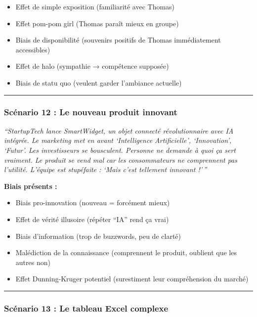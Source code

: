 \documentclass[
]{article}
\providecommand{\tightlist}{%
  \setlength{\itemsep}{0pt}\setlength{\parskip}{0pt}}
\begin{document}
\begin{itemize}
\tightlist
\item
  Effet de simple exposition (familiarité avec Thomas)
\item
  Effet pom-pom girl (Thomas paraît mieux en groupe)
\item
  Biais de disponibilité (souvenirs positifs de Thomas immédiatement
  accessibles)
\item
  Effet de halo (sympathie → compétence supposée)
\item
  Biais de statu quo (veulent garder l'ambiance actuelle)
\end{itemize}

\begin{center}\rule{0.5\linewidth}{0.5pt}\end{center}

\subsubsection{Scénario 12 : Le nouveau produit
innovant}\label{scuxe9nario-12-le-nouveau-produit-innovant}

\emph{``StartupTech lance SmartWidget, un objet connecté révolutionnaire
avec IA intégrée. Le marketing met en avant `Intelligence Artificielle',
`Innovation', `Futur'. Les investisseurs se bousculent. Personne ne
demande à quoi ça sert vraiment. Le produit se vend mal car les
consommateurs ne comprennent pas l'utilité. L'équipe est stupéfaite :
`Mais c'est tellement innovant !'\,''}

\textbf{Biais présents :}

\begin{itemize}
\tightlist
\item
  Biais pro-innovation (nouveau = forcément mieux)
\item
  Effet de vérité illusoire (répéter ``IA'' rend ça vrai)
\item
  Biais d'information (trop de buzzwords, peu de clarté)
\item
  Malédiction de la connaissance (comprennent le produit, oublient que
  les autres non)
\item
  Effet Dunning-Kruger potentiel (surestiment leur compréhension du
  marché)
\end{itemize}

\begin{center}\rule{0.5\linewidth}{0.5pt}\end{center}

\subsubsection{Scénario 13 : Le tableau Excel
complexe}\label{scuxe9nario-13-le-tableau-excel-complexe}
\end{document}
